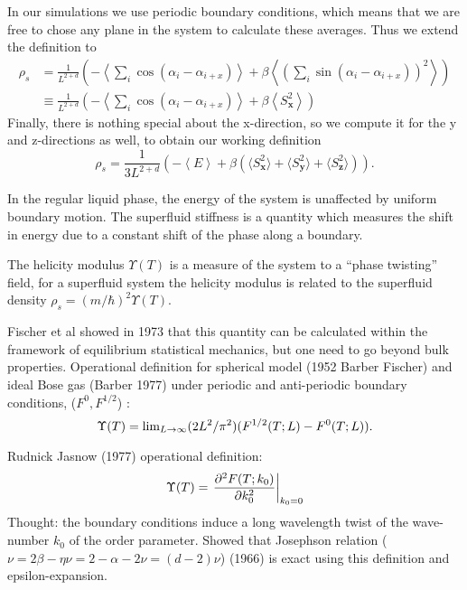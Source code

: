In our simulations we use periodic boundary conditions, which means that we are free to chose any plane in the system to calculate these averages. Thus we extend the definition to
\begin{align}
  \rho_s &= \frac{1}{L^{2+d}}\left(-\left\langle \sum_{i}\cos(\alpha_i -\alpha_{i+x} )\right\rangle + \beta\left\langle\left(\sum_{i}\sin(\alpha_i - \alpha_{i+x}) \right)^2\right\rangle\right) \\
  &\equiv\frac{1}{L^{2+d}}\left(-\left\langle \sum_{i}\cos(\alpha_i -\alpha_{i+x} )\right\rangle + \beta\left\langle S^2_{\bm{x}} \right\rangle\right)
\end{align}
Finally, there is nothing special about the x-direction, so we compute it for the y and z-directions as well, to obtain our working definition
\begin{equation}
  \rho_s = \frac{1}{3 L^{2+d}}\left(-\left\langle E \right\rangle + \beta\left( \langle S^2_{\bm{x}}\rangle + \langle S^2_{\bm{y}}\rangle + \langle S^2_{\bm{z}}\rangle\right) \right).
  \label{}
\end{equation}



In the regular liquid phase, the energy of the system is unaffected by uniform boundary motion. The superfluid stiffness is a quantity which measures the shift in energy due to a constant shift of the phase along a boundary.

The helicity modulus $\Upsilon(T)$ is a measure of the system to a ``phase twisting'' field, for a superfluid system the helicity modulus is related to the superfluid density
$\rho_s = (m/\hbar)^2 \Upsilon(T)$.

Fischer et al showed in 1973 that this quantity can be calculated within the framework of equilibrium statistical mechanics, but one need to go beyond bulk properties.
Operational definition for spherical model (1952 Barber Fischer) and ideal Bose gas (Barber 1977) under periodic and anti-periodic boundary conditions, ($F^{0},F^{1/2}$) :
\begin{equation}
  \Upsilon(T) = \textrm{lim}_{L\rightarrow \infty} (2L^2/\pi^2) (F^{1/2} (T;L)-F^0(T;L)).
  \label{}
\end{equation}

Rudnick Jasnow (1977) operational definition: 
\begin{equation}
  \Upsilon(T) = \left. \frac{  \partial^2F(T;k_0)}{\partial k^2_0}\right|_{k_0 =0}
  \label{}
\end{equation}
Thought: the boundary conditions induce a long wavelength twist of the wave-number $k_0$ of the order parameter.
Showed that Josephson relation ($\nu = 2\beta -\eta\nu = 2 - \alpha -2\nu = (d -2)\nu$) (1966) is exact using this definition and epsilon-expansion.

